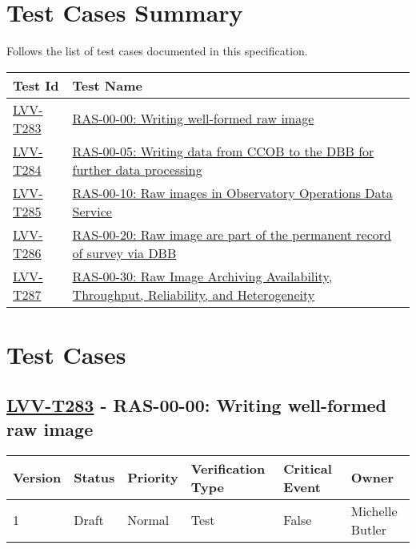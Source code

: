 \section{Test Cases Summary}\label{test-cases-summary}

Follows the list of test cases documented in this specification.

\begin{longtable}[]{p{3cm}p{13cm}}
\toprule
Test Id & Test Name\tabularnewline
\midrule
\endhead
    \hyperref[lvv-t283]{LVV-T283} &
    \href{https://jira.lsstcorp.org/secure/Tests.jspa\#/testCase/LVV-T283}{RAS-00-00: Writing well-formed raw image} \tabularnewline
    \hyperref[lvv-t284]{LVV-T284} &
    \href{https://jira.lsstcorp.org/secure/Tests.jspa\#/testCase/LVV-T284}{RAS-00-05: Writing data from CCOB to the DBB for further data processing} \tabularnewline
    \hyperref[lvv-t285]{LVV-T285} &
    \href{https://jira.lsstcorp.org/secure/Tests.jspa\#/testCase/LVV-T285}{RAS-00-10: Raw images in Observatory Operations Data Service} \tabularnewline
    \hyperref[lvv-t286]{LVV-T286} &
    \href{https://jira.lsstcorp.org/secure/Tests.jspa\#/testCase/LVV-T286}{RAS-00-20: Raw image are part of the permanent record of survey via DBB} \tabularnewline
    \hyperref[lvv-t287]{LVV-T287} &
    \href{https://jira.lsstcorp.org/secure/Tests.jspa\#/testCase/LVV-T287}{RAS-00-30: Raw Image Archiving Availability, Throughput, Reliability, and Heterogeneity} \tabularnewline
\bottomrule
\end{longtable}

\newpage

\section{Test Cases}

\subsection{\href{https://jira.lsstcorp.org/secure/Tests.jspa\#/testCase/LVV-T283}{LVV-T283}
    - RAS-00-00: Writing well-formed raw image}\label{lvv-t283}

\begin{longtable}[]{llllll}
\toprule
Version & Status & Priority & Verification Type & Critical Event & Owner
\\\midrule
1 & Draft & Normal &
Test & False & Michelle Butler
\\\bottomrule
\end{longtable}

